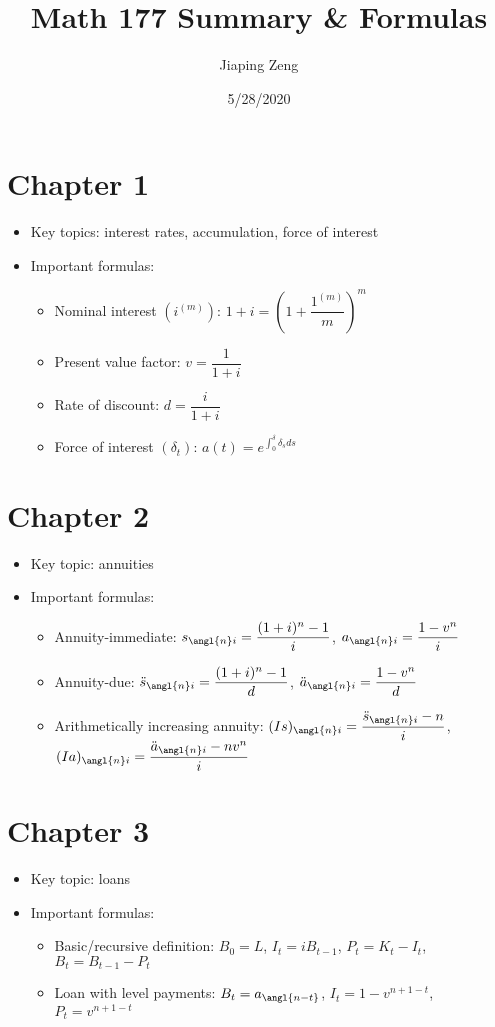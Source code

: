\documentclass{article}
\title{Math 177 Summary \& Formulas}
\author{Jiaping Zeng}
\date{5/28/2020}
\begin{document}
\maketitle

\section*{Chapter 1}
\begin{itemize}
	\item Key topics: interest rates, accumulation, force of interest
	\item Important formulas:
	\begin{itemize}
		\item Nominal interest $(i^{(m)})$: $1+i=\left(1+\dfrac{1^{(m)}}{m}\right)^m$
		\item Present value factor: $v=\dfrac{1}{1+i}$
		\item Rate of discount: $d=\dfrac{i}{1+i}$
		\item Force of interest $(\delta_t)$: $a(t)=e^{\int_0^\delta \delta_s ds}$
	\end{itemize}
\end{itemize}

\section*{Chapter 2}
\begin{itemize}
	\item Key topic: annuities
	\item Important formulas:
	\begin{itemize}
		\item Annuity-immediate: $s_{\angl{n}i}=\dfrac{(1+i)^n-1}{i}$, $a_{\angl{n}i}=\dfrac{1-v^n}{i}$
		\item Annuity-due: $\ddot{s}_{\angl{n}i}=\dfrac{(1+i)^n-1}{d}$, $\ddot{a}_{\angl{n}i}=\dfrac{1-v^n}{d}$
		\item Arithmetically increasing annuity: $(Is)_{\angl{n}i}=\dfrac{\ddot{s}_{\angl{n}i}-n}{i}$, $(Ia)_{\angl{n}i}=\dfrac{\ddot{a}_{\angl{n}i}-nv^n}{i}$
	\end{itemize}
\end{itemize}

\section*{Chapter 3}
\begin{itemize}
	\item Key topic: loans
	\item Important formulas:
	\begin{itemize}
		\item Basic/recursive definition: $B_0=L$, $I_t=iB_{t-1}$, $P_t=K_t-I_t$, $B_t=B_{t-1}-P_t$
		\item Loan with level payments: $B_t=a_\angl{n-t}$, $I_t=1-v^{n+1-t}$, $P_t=v^{n+1-t}$
	\end{itemize}
\end{itemize}
\end{document}
